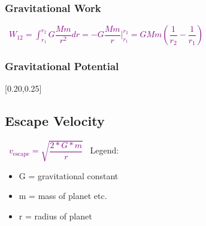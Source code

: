 \documentclass[main.tex,fontsize=8pt,paper=a4,paper=portrait,DIV=calc,]{scrartcl}
\begin{document}
\begin{multicols*}{2}
\subsubsection{Gravitational Work}
\, \newline
\large \textcolor{purple}{\( W_{12} = \int_{r_1}^{r_2} G \dfrac{Mm}{r^2}dr = -G\dfrac{Mm}{r}|^{r_2}_{r_1} = GMm\left( \dfrac{1}{r_2} - \dfrac{1}{r_1} \right) \)}\newline
\, \newline
\normalsize

\subsubsection{Gravitational Potential}
[0.20,0.25]

\subsection{Escape Velocity}
\, \newline
\large \textcolor{purple}{ \(v_{\text{escape}} = \sqrt{\dfrac{2 * G * m}{r}} \)}\newline
\, \newline
\normalsize Legend: \newline
\begin{itemize}
\item G = gravitational constant
\item m = mass of planet etc. 
\item r = radius of planet  
\end{itemize} 


\end{multicols*}
\end{document}
